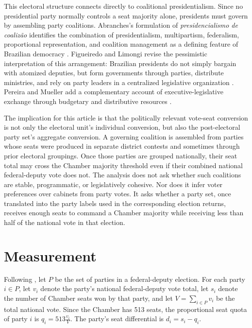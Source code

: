 \documentclass[11pt]{article}
\newcommand{\Quota}{q}
\newcommand{\Diff}{d}
\newcommand{\Parties}{P}
\begin{document}
This electoral structure connects directly to coalitional presidentialism. Since no
presidential party normally controls a seat majority alone, presidents must govern
by assembling party coalitions. Abranches's formulation of
\emph{presidencialismo de coalizão} identifies the combination of presidentialism,
multipartism, federalism, proportional representation, and coalition management as
a defining feature of Brazilian democracy \parencite{abranches1988presidencialismo}.
Figueiredo and Limongi revise the pessimistic interpretation of this arrangement:
Brazilian presidents do not simply bargain with atomized deputies, but form
governments through parties, distribute ministries, and rely on party leaders in a
centralized legislative organization \parencite{figueiredo2000presidential}.
Pereira and Mueller add a complementary account of executive-legislative exchange
through budgetary and distributive resources \parencite{pereira2004cost}.

The implication for this article is that the politically relevant vote-seat
conversion is not only the electoral unit's individual conversion, but also the
post-electoral party set's aggregate conversion. A governing coalition is assembled
from parties whose seats were produced in separate district contests and sometimes
through prior electoral groupings. Once those parties are grouped nationally, their
seat total may cross the Chamber majority threshold even if their combined national
federal-deputy vote does not. The analysis does not ask whether such coalitions
are stable, programmatic, or legislatively cohesive. Nor does it infer voter
preferences over cabinets from party votes. It asks whether a party set, once translated into the party labels used in the
corresponding election returns, receives enough seats to command a Chamber
majority while receiving less than half of the national vote in that election.

\section{Measurement}
\label{sec:mea}

Following \textcite{miller14_elect_inver_under_propor_repres}, let $\Parties$ be the set of parties in a federal-deputy election. For each party
$i \in \Parties$, let $v_i$ denote the party's national federal-deputy vote total,
let $s_i$ denote the number of Chamber seats won by that party, and let $V =
\sum_{i\in\Parties} v_i$ be the total national vote. Since the Chamber has 513
seats, the proportional seat quota of party $i$ is
\(
  \Quota_i = 513\frac{v_i}{V}. \)
The party's seat differential is \(  \Diff_i = s_i - \Quota_i.\)
\end{document}
